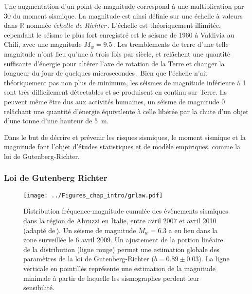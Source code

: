Une augmentation d'un point de magnitude correspond à une multiplication par 30 du moment sismique. La magnitude est ainsi définie sur une échelle à valeurs dans $\mathbb{R}$ nommée \textit{échelle de Richter}\,\cite{kanamori_quantification_1978}. L'échelle est théoriquement illimitée, cependant le séisme le plus fort enregistré est le séisme de 1960 à Valdivia au Chili, avec une magnitude $M_w=9.5$\,\cite{ruiz_historical_2018}. Les tremblements de terre d'une telle magnitude n'ont lieu qu'une à trois fois par siècle, et relâchent une quantité suffisante d'énergie pour altérer l'axe de rotation de la Terre et changer la longueur du jour de quelques microsecondes\,\cite{chao_changes_1987}. Bien que l'échelle n'ait théoriquement pas non plus de minimum, les séismes de magnitude inférieure à 1 sont très difficilement détectables et se produisent en continu sur Terre. Ils peuvent même être dus aux activités humaines, un séisme de magnitude 0 relâchant une quantité d'énergie équivalente à celle libérée par la
chute d'un objet d'une tonne d'une hauteur de \SI{5}{\meter}.

Dans le but de décrire et prévenir les risques sismiques, le moment sismique et la magnitude font l'objet d'études statistiques et de modèle empiriques, comme la loi de Gutenberg-Richter.


\subsubsection{Loi de Gutenberg Richter}

\label{sec:gutricht}

\begin{figure}[htb]
\centering
\texttt{[image: ../Figures\_chap\_intro/grlaw.pdf]}
\caption[Loi de Gutenberg-Richter]{Distribution fréquence-magnitude cumulée des évènements sismiques dans la région de Abruzzi en Italie, entre avril 2007 et avril 2010 (adapté de\,\cite{de_santis_gutenberg-richter_2011}). Un séisme de magnitude $M_w=6.3$ a eu lieu dans la zone surveillée le 6 avril 2009. Un ajustement de la portion linéaire de la distribution (ligne rouge) permet une estimation globale des paramètres de la loi de Gutenberg-Richter ($b=0.89\pm0.03$). La ligne verticale en pointillés représente une estimation de la magnitude minimale à partir de laquelle les sismographes perdent leur sensibilité.}
\label{fig:grlaw}
\end{figure}

